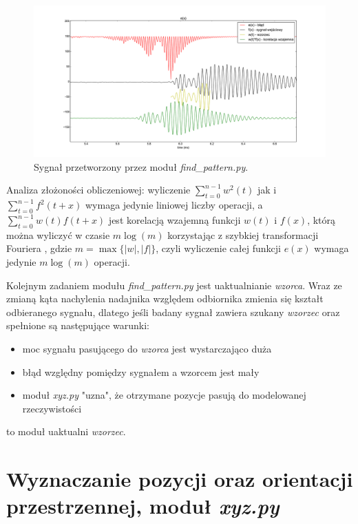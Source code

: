 \begin{figure}[h!]
    \centering
    \includegraphics[width=1.15\textwidth, trim= 47mm 0mm 0mm 0mm,clip]{blad_korel}
    \caption{Sygnał przetworzony przez moduł \textit{find\_pattern.py}.}
    \label{fig:blad_korel}
\end{figure}
 
 
 Analiza złożoności obliczeniowej: wyliczenie $ \sum\limits_{t=0}^{n-1}  w^2(t) $ 
jak i $\sum\limits_{t=0}^{n-1} f^2(t+x)$ wymaga jedynie liniowej liczby operacji, a 
 $\sum\limits_{t=0}^{n-1}  w(t) f(t+x) $ jest korelacją wzajemną funkcji $w(t)$ i $f(x)$, którą
 można wyliczyć w czasie $m \log(m)$ korzystając z szybkiej transformacji Fouriera \cite{bib:FFT_correlation},
 gdzie $m = \max \{|w|, |f| \}$, czyli wyliczenie całej funkcji $e(x)$ wymaga jedynie $m \log(m)$ operacji.

 
 Kolejnym zadaniem modułu \textit{find\_pattern.py} jest uaktualnianie \textit{wzorca}.
 Wraz ze zmianą kąta nachylenia nadajnika względem odbiornika zmienia się kształt odbieranego sygnału,
 dlatego jeśli badany sygnał zawiera szukany \textit{wzorzec} oraz spełnione są następujące warunki:
 \begin{itemize}
  \item moc sygnału pasującego do \textit{wzorca} jest wystarczająco duża
  \item błąd względny pomiędzy sygnałem a wzorcem jest mały
  \item moduł \textit{xyz.py} "uzna", że otrzymane pozycje pasują do modelowanej rzeczywistości
 \end{itemize}
to moduł uaktualni \textit{wzorzec}.
  
 
\section{Wyznaczanie pozycji oraz orientacji przestrzennej, moduł \textit{xyz.py}}

